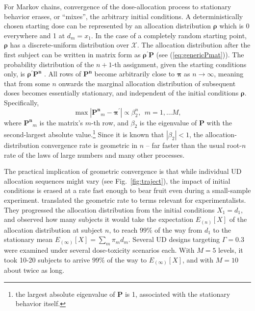 For Markov chains, convergence of the dose-allocation process to stationary behavior erases, or ``mixes'', the arbitrary initial conditions. A deterministically chosen starting dose can be represented by an allocation distribution $\boldsymbol{\rho}$ which is 0 everywhere and 1 at $d_m=x_1$. In the case of a completely random starting point, $\boldsymbol{\rho}$ has a discrete-uniform distribution over $\mathcal{X}$. The allocation distribution after the first subject can be written in matrix form as $\boldsymbol{\rho}^{'}\mathbf{P}$ (see (\ref{eq:genericPmat})). The probability distribution of the $n+1$-th assignment, given the starting conditions only, is $\boldsymbol{\rho}^{'}\mathbf{P^n}$ \cite[cf.,][]{Diac:Stro:geom:1991}. All rows of $\mathbf{P^n}$ become arbitrarily close to $\boldsymbol{\pi}$ as $n\to\infty$, meaning that from some $n$ onwards the marginal allocation distribution of subsequent doses becomes essentially stationary, and independent of the initial conditions $\boldsymbol{\rho}$. Specifically,
\begin{equation}\label{eq:diac}
\max\left|\mathbf{P^n}_{m}-\boldsymbol{\pi}^\prime\right|\propto\beta_2^n,\ \ m=1,\ldots M,
\end{equation}
\noindent where $\mathbf{P^n}_{m}$ is the matrix's $m$-th row, and $\beta_2$ is the eigenvalue of $\mathbf{P}$ with the second-largest absolute value.\footnote{
the largest absolute eigenvalue of $\mathbf{P}$ is 1, associated with the stationary behavior itself.} Since it is known that $\left|\beta_2\right|<1$, the allocation-distribution convergence rate is geometric in $n$ --  far faster than the usual root-$n$ rate of the laws of large numbers and many other processes.

The practical implication of geometric convergence is that while individual UD allocation sequences might vary (see Fig.~\ref{fig:traject}), the impact of initial conditions is erased at a rate fast enough to bear fruit even during a small-sample experiment. \cite{Oron:Hoff:thek:2009} translated the geometric rate to terms relevant for experimentalists. They progressed the allocation distribution from the initial conditions $X_1=d_1$, and observed how many subjects it would take the expectation $E_{(n)}[X]$ of the allocation distribution at subject $n$,  to reach $99\%$ of the way from $d_1$ to the stationary mean $E_{(\infty)}[X]=\sum_m \pi_m d_m$. Several UD designs targeting $\Gamma=0.3$ were examined under several dose-toxicity scenarios each. With $M=5$ levels, it took 10-20 subjects to arrive $99\%$ of the way to $E_{(\infty)}[X]$, and with $M=10$ about twice as long.

